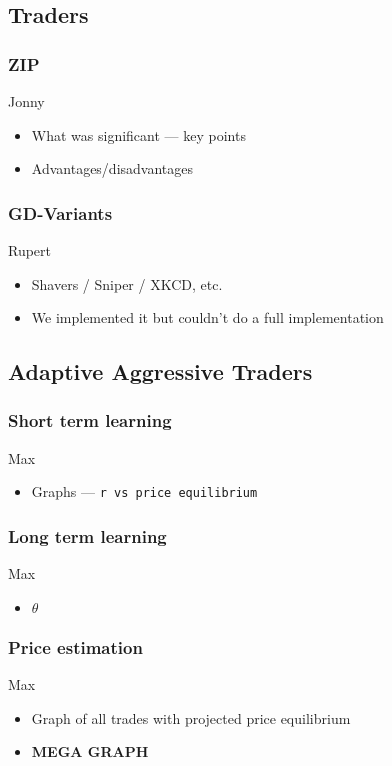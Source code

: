 \documentclass[12pt]{article} %
\begin{document}
\subsection{Traders}
\subsubsection{ZIP}
Jonny
\begin{itemize} \itemsep0pt
	\item What was significant --- key points
	\item Advantages/disadvantages
\end{itemize}

\subsubsection{GD-Variants}
Rupert
\begin{itemize} \itemsep0pt
	\item Shavers / Sniper / XKCD, etc.
	\item We implemented it but couldn't do a full implementation
\end{itemize}

\subsection{Adaptive Aggressive Traders}
\subsubsection{Short term learning}
Max
\begin{itemize} \itemsep0pt
	\item Graphs --- \tt r \rm vs price equilibrium
\end{itemize}

\subsubsection{Long term learning}
Max
\begin{itemize} \itemsep0pt
	\item $\theta$
\end{itemize}

\subsubsection{Price estimation}
Max
\begin{itemize} \itemsep0pt
	\item Graph of all trades with projected price equilibrium
	\item \textbf{MEGA GRAPH}
\end{itemize}
\end{document}
